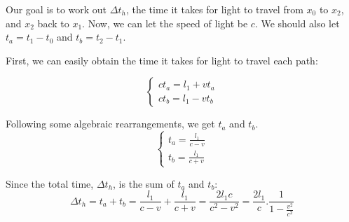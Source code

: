 \documentclass[a4paper,11pt]{article}
\numberwithin{equation}{section}
\begin{document}
  \noindent Our goal is to work out $\Delta t_{h}$, the time it takes for light to travel from $x_{0}$ to $x_{2}$, and $x_{2}$ back to $x_{1}$. Now, we can let the speed of light be $c$. We should also let $t_{a}=t_{1}-t_{0}$ and $t_{b}=t_{2}-t_{1}$. 
  
  \noindent First, we can easily obtain the time it takes for light to travel each path:
  
  \begin{equation} \label{eq:2.2}
  \begin{cases} 
  ct_{a}=l_{1}+vt_{a} \\
  ct_{b}=l_{1}-vt_{b} 
  \end{cases}
  \end{equation}
  
  \noindent Following some algebraic rearrangements, we get $t_{a}$ and $t_{b}$.
  \begin{equation} \label{eq:2.3}
  \begin{cases} 
  t_{a}=\frac{l_{1}}{c-v} \\
  t_{b}=\frac{l_{1}}{c+v} 
  \end{cases}
  \end{equation}
  
  \noindent Since the total time, $\Delta t_{h}$, is the sum of $t_{a}$ and $t_{b}$:
  \begin{equation} \label{eq:2.4} 
  \Delta t_{h}=t_{a}+t_{b}=\frac{l_{1}}{c-v}+\frac{l_{1}}{c+v}=\frac{2l_{1}c}{c^2-v^2}=\frac{2l_{1}}{c}.\frac{1}{1-\frac{v^2}{c^2}}
  \end{equation}
 
\end{document}
